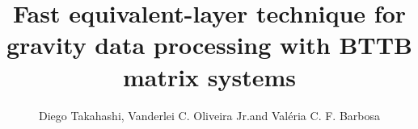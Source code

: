 \documentclass[manuscript,blind]{geophysics}
\begin{document}
\title{Fast equivalent-layer technique for gravity data processing with BTTB matrix systems}

\renewcommand{\thefootnote}{\fnsymbol{footnote}} 


\address{
\footnotemark[2]Observat\'{o}rio Nacional, Department of Geophysics, Rio de Janeiro, Brazil\\
\footnotemark[1] Corresponding author: diego.takahashi@gmail.com
}
\author{Diego Takahashi\footnotemark[2]\footnotemark[1], Vanderlei C. Oliveira{ }Jr.\footnotemark[2] and 
Val{\'e}ria C. F. Barbosa\footnotemark[2]}


\maketitle







%








\end{document}
